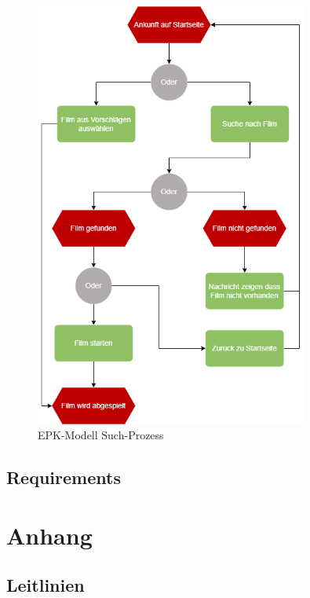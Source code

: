 \begin{appendix}
    \begin{figure}[ht]
        \centering
        \includegraphics[width=0.8\textwidth]{images/ReQ_MovieSearch_EPK}
        \caption{EPK-Modell Such-Prozess}
        \label{fig:epk_search}
    \end{figure}

    \subsection{Requirements}\label{subsec:requirements_catalouge}
    

    \section{Anhang}

    \subsection{Leitlinien}
    
\end{appendix}
